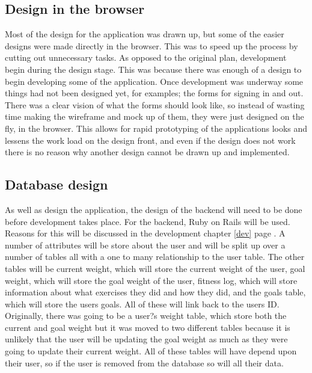 \subsection{Design in the browser}
Most of the design for the application was drawn up, but some of the easier designs were made directly in the browser. This was to speed up the process by cutting out unnecessary tasks. As opposed to the original plan, development begin during the design stage. This was because there was enough of a design to begin developing some of the application. Once development was underway some things had not been designed yet, for examples; the forms for signing in and out. There was a clear vision of what the forms should look like, so instead of wasting time making the wireframe and mock up of them, they were just designed on the fly, in the browser. This allows for rapid prototyping of the applications looks and lessens the work load on the design front, and even if the design does not work there is no reason why another design cannot be drawn up and implemented.\\

\subsection{Database design}
As well as design the application, the design of the backend will need to be done before development takes place. For the backend, Ruby on Rails \citep{rails:2013} will be used. Reasons for this will be discussed in the development chapter \ref{dev} page \pageref{dev}. A number of attributes will be store about the user and will be split up over a number of tables all with a one to many relationship to the user table. The other tables will be current weight, which will store the current weight of the user, goal weight, which will store the goal weight of the user, fitness log, which will store information about what exercises they did and how they did, and the goals table, which will store the users goals. All of these will link back to the users ID. Originally, there was going to be a user?s weight table, which store both the current and goal weight but it was moved to two different tables because it is unlikely that the user will be updating the goal weight as much as they were going to update their current weight. All of these tables will have depend upon their user, so if the user is removed from the database so will all their data.